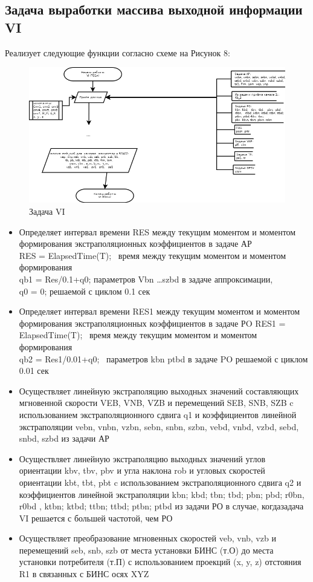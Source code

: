 \subsection{Задача выработки массива выходной информации VI}
Реализует следующие функции согласно схеме на Рисунок 8:
\begin{figure}[H]
    \centering
    \includegraphics[width=0.75\linewidth]{images/VI_simple.png}
    \caption{Задача VI}
    \label{fig:VI}
\end{figure}
\begin{itemize}
    \item Определяет интервал времени RES  между текущим моментом и  моментом формирования экстраполяционных  коэффициентов в  задаче АР \\
RES = ElapsedTime(T);  \ время между текущим моментом  и моментом формирования \\
            qb1 = Res/0.1+q0;   параметров   Vbn …szbd в задаче аппроксимации, \\
            q0 = 0;             решаемой с циклом 0.1 сек \\
    \item Определяет   интервал времени  RES1  между текущим моментом  и  моментом формирования экстраполяционных  коэффициентов в  задаче   РO 
RES1 = ElapsedTime(T);  \ время между текущим моментом и моментом формирования \\
            qb2 = Res1/0.01+q0;       \ параметров  kbn   ptbd в задаче PO решаемой с циклом 0.01 сек
    \item Осуществляет  линейную  экстраполяцию  выходных  значений  составляющих  мгновенной скорости  VEB,  VNB, VZB  и  перемещений  
    SEB,  SNB,  SZB  c  использованием экстраполяционного сдвига q1  и  коэффициентов   линейной  экстраполяции vebn, vnbn, vzbn, sebn, snbn, szbn, 
    vebd, vnbd, vzbd, sebd, snbd, szbd   из задачи АР
    \item Осуществляет  линейную  экстраполяцию  выходных  значений углов  ориентации  kbv,  tbv,  pbv  и угла наклона  rob  и  
    угловых скоростей  ориентации kbt,  tbt,  pbt c  использованием экстраполяционного сдвига   q2  и  коэффициентов   линейной 
    экстраполяции      kbn;   kbd;   tbn;   tbd;   pbn;   pbd;    r0bn,   r0bd , ktbn;  ktbd;  ttbn;   ttbd;  ptbn;   ptbd     
    из задачи РО   в  случае,  когдазадача VI  решается  с  большей  частотой,  чем   РО 
    \item Осуществляет преобразование мгновенных скоростей veb, vnb, vzb и перемещений   seb, snb, szb от места установки БИНС  (т.О) 
    до места установки потребителя (т.П) с использованием проекций (x, y, z) отстояния R1 в связанных с БИНС  осях XYZ 
\end{itemize}
